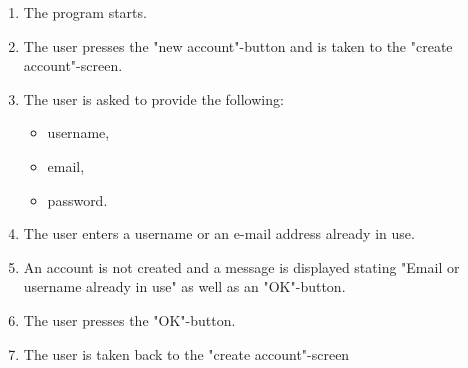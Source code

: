 \documentclass{article}
\begin{document}
\begin{enumerate}
    \item The program starts.
    \item The user presses the "new account"-button and is taken to the "create account"-screen.
    \item The user is asked to provide the following: 
        \begin{itemize}
            \item username,
            \item email,
            \item password.
        \end{itemize}
    \item The user enters a username or an e-mail address already in use.
    \item An account is not created and a message is displayed stating "Email or username already in use" as well as an "OK"-button. 
    \item The user presses the "OK"-button.
    \item The user is taken back to the "create account"-screen
\end{enumerate}
\end{document}
